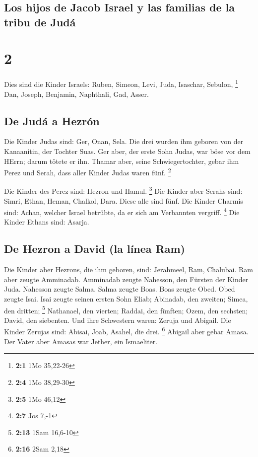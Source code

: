 \hypertarget{los-hijos-de-jacob-israel-y-las-familias-de-la-tribu-de-juduxe1}{%
\subsection{Los hijos de Jacob Israel y las familias de la tribu de
Judá}\label{los-hijos-de-jacob-israel-y-las-familias-de-la-tribu-de-juduxe1}}

\hypertarget{section-1}{%
\section{2}\label{section-1}}

 Dies sind die Kinder Israels: Ruben, Simeon, Levi, Juda,
Isaschar, Sebulon, \footnote{\textbf{2:1} 1Mo 35,22-26} 
Dan, Joseph, Benjamin, Naphthali, Gad, Asser.

\hypertarget{de-juduxe1-a-hezruxf3n}{%
\subsection{De Judá a Hezrón}\label{de-juduxe1-a-hezruxf3n}}

 Die Kinder Judas sind: Ger, Onan, Sela. Die drei wurden
ihm geboren von der Kanaanitin, der Tochter Suas. Ger aber, der erste
Sohn Judas, war böse vor dem HErrn; darum tötete er ihn. 
Thamar aber, seine Schwiegertochter, gebar ihm Perez und Serah, dass
aller Kinder Judas waren fünf. \footnote{\textbf{2:4} 1Mo 38,29-30}

 Die Kinder des Perez sind: Hezron und Hamul. \footnote{\textbf{2:5}
  1Mo 46,12}  Die Kinder aber Serahs sind: Simri, Ethan,
Heman, Chalkol, Dara. Diese alle sind fünf.  Die Kinder
Charmis sind: Achan, welcher Israel betrübte, da er sich am Verbannten
vergriff. \footnote{\textbf{2:7} Jos 7,-1}  Die Kinder
Ethans sind: Asarja.

\hypertarget{de-hezron-a-david-la-luxednea-ram}{%
\subsection{De Hezron a David (la línea
Ram)}\label{de-hezron-a-david-la-luxednea-ram}}

 Die Kinder aber Hezrons, die ihm geboren, sind:
Jerahmeel, Ram, Chalubai.  Ram aber zeugte Amminadab.
Amminadab zeugte Nahesson, den Fürsten der Kinder Juda. 
Nahesson zeugte Salma. Salma zeugte Boas.  Boas zeugte
Obed. Obed zeugte Isai.  Isai zeugte seinen ersten Sohn
Eliab; Abinadab, den zweiten; Simea, den dritten; \footnote{\textbf{2:13}
  1Sam 16,6-10}  Nathanael, den vierten; Raddai, den
fünften;  Ozem, den sechsten; David, den siebenten.
 Und ihre Schwestern waren: Zeruja und Abigail. Die
Kinder Zerujas sind: Abisai, Joab, Asahel, die drei. \footnote{\textbf{2:16}
  2Sam 2,18}  Abigail aber gebar Amasa. Der Vater aber
Amasas war Jether, ein Ismaeliter.

